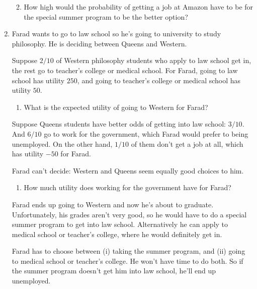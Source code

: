 \documentclass[justified]{tufte-book}
\providecommand{\tightlist}{%
  \setlength{\itemsep}{0pt}\setlength{\parskip}{0pt}}
\theoremstyle{definition}
\theoremstyle{definition}
\theoremstyle{definition}
\theoremstyle{definition}
\theoremstyle{remark}
\begin{document}
\begin{enumerate}
  \begin{enumerate}
  \def\labelenumii{\alph{enumii}.}
  \setcounter{enumii}{2}
  \tightlist
  \item
    How high would the probability of getting a job at Amazon have to be for the special summer program to be the better option?
  \end{enumerate}
\item
  Farad wants to go to law school so he's going to university to study philosophy. He is deciding between Queens and Western.

  Suppose \(2/10\) of Western philosophy students who apply to law school get in, the rest go to teacher's college or medical school. For Farad, going to law school has utility \(250\), and going to teacher's college or medical school has utility \(50\).

  \begin{enumerate}
  \def\labelenumii{\alph{enumii}.}
  \tightlist
  \item
    What is the expected utility of going to Western for Farad?
  \end{enumerate}

  Suppose Queens students have better odds of getting into law school: \(3/10\). And \(6/10\) go to work for the government, which Farad would prefer to being unemployed. On the other hand, \(1/10\) of them don't get a job at all, which has utility \(-50\) for Farad.

  Farad can't decide: Western and Queens seem equally good choices to him.

  \begin{enumerate}
  \def\labelenumii{\alph{enumii}.}
  \setcounter{enumii}{1}
  \tightlist
  \item
    How much utility does working for the government have for Farad?
  \end{enumerate}

  Farad ends up going to Western and now he's about to graduate. Unfortunately, his grades aren't very good, so he would have to do a special summer program to get into law school. Alternatively he can apply to medical school or teacher's college, where he would definitely get in.

  Farad has to choose between (i) taking the summer program, and (ii) going to medical school or teacher's college. He won't have time to do both. So if the summer program doesn't get him into law school, he'll end up unemployed.


\end{enumerate}
\end{document}
